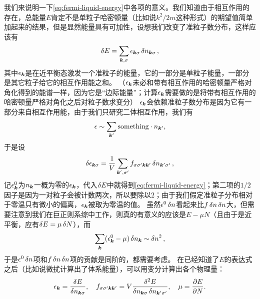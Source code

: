 \documentclass[hyperref, UTF8, a4paper]{ctexart}
\begin{document}
我们来说明一下\eqref{eq:fermi-liquid-energy}中各项的意义。我们知道由于相互作用的存在，总能量$E$肯定不是单粒子哈密顿量（比如说$k^2/2m$这种形式）的期望值简单加起来的结果，但是显然能量具有可加性，设想我们改变了准粒子数分布，这样应该有
\[
    \var{E} = \sum_{\vb*{k}, \sigma} \epsilon_{\vb*{k} \sigma} \var{n_{\vb*{k} \sigma}},
\]
其中$\epsilon_{\vb*{k}}$是在近平衡态激发一个准粒子的能量，它的一部分是单粒子能量，一部分是其它粒子给它的相互作用能之和。
（$\epsilon_{\vb*{k}}$未必和带有相互作用的哈密顿量严格对角化得到的能谱一样，因为它是“边际能量”；计算$\epsilon_{\vb*{k}}$需要做的是将带有相互作用的哈密顿量严格对角化之后对粒子数求变分）
$\epsilon_{\vb*{k}}$会依赖准粒子数分布是因为它有一部分来自相互作用能，由于我们只研究二体相互作用，我们有
\[
    \epsilon \sim \sum_{\vb*{k}'} \text{something} \cdot n_{\vb*{k}'},
\]
于是设
\[
    \var{\epsilon_{\vb*{k} \sigma}} = \frac{1}{V} \sum_{\vb*{k}', \sigma'} f_{\sigma \sigma' \vb*{k} \vb*{k}'} \var{n_{\vb*{k}' \sigma'}},
\]
记$\epsilon_{\vb*{k}}^0$为$n_{\vb*{k}}$一概为零的$\epsilon_{\vb*{k}}$，代入$\var{E}$中就得到\eqref{eq:fermi-liquid-energy}；第二项的$1/2$因子是因为一对粒子会被计数两次，所以要除以$2$；由于我们假定准粒子分布相对于零温只有微小的偏离，$\epsilon_{\vb*{k}}$被取为零温的值。
虽然$\epsilon^0 \var{n}$看起来比$f\var{n} \var{n}$大，但需要注意到我们在巨正则系综中工作，则真的有意义的应该是$E-\mu N$（且由于是近平衡，应有$\var{E} = \mu \var{N}$），而
\[
    \sum_{\vb*{k}} (\epsilon^0_{\vb*{k}} - \mu) \var{n_{\vb*{k}}} \sim \var{n}^2,
\]
于是$\epsilon^0 \var{n}$项和$f\var{n} \var{n}$项的贡献是同阶的，都需要考虑。
在已经知道了$E$的表达式之后（比如说微扰计算出了体系能量），可以用变分计算出各个物理量：
\begin{equation}
    \epsilon_{\vb*{k}} = \fdv{E}{n_{\vb*{k} \sigma}} , \quad f_{\sigma \sigma' \vb*{k} \vb*{k}'} = V \frac{\var[2]{E}}{\var{n_{\vb*{k} \sigma}}\var{n_{\vb*{k}' \sigma'}}}, \quad \mu = \pdv{E}{N}.
\end{equation}
\end{document}
